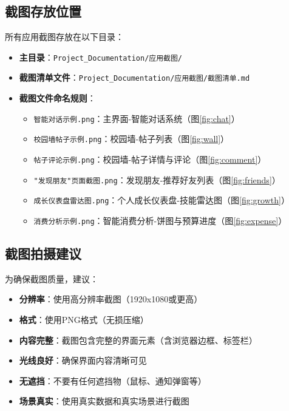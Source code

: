 \documentclass[12pt,a4paper]{article}
\begin{document}
\subsection{截图存放位置}

所有应用截图存放在以下目录：

\begin{itemize}
    \item \textbf{主目录}：\texttt{Project\_Documentation/应用截图/}
    \item \textbf{截图清单文件}：\texttt{Project\_Documentation/应用截图/截图清单.md}
    \item \textbf{截图文件命名规则}：
        \begin{itemize}
            \item \texttt{智能对话示例.png}：主界面-智能对话系统（图\ref{fig:chat}）
            \item \texttt{校园墙帖子示例.png}：校园墙-帖子列表（图\ref{fig:wall}）
            \item \texttt{帖子评论示例.png}：校园墙-帖子详情与评论（图\ref{fig:comment}）
            \item \texttt{"发现朋友"页面截图.png}：发现朋友-推荐好友列表（图\ref{fig:friends}）
            \item \texttt{成长仪表盘雷达图.png}：个人成长仪表盘-技能雷达图（图\ref{fig:growth}）
            \item \texttt{消费分析示例.png}：智能消费分析-饼图与预算进度（图\ref{fig:expense}）
        \end{itemize}
\end{itemize}

\subsection{截图拍摄建议}

为确保截图质量，建议：

\begin{itemize}
    \item \textbf{分辨率}：使用高分辨率截图（1920x1080或更高）
    \item \textbf{格式}：使用PNG格式（无损压缩）
    \item \textbf{内容完整}：截图包含完整的界面元素（含浏览器边框、标签栏）
    \item \textbf{光线良好}：确保界面内容清晰可见
    \item \textbf{无遮挡}：不要有任何遮挡物（鼠标、通知弹窗等）
    \item \textbf{场景真实}：使用真实数据和真实场景进行截图
\end{itemize}
\end{document}
